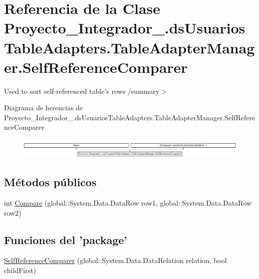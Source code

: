 \hypertarget{class_proyecto___integrador__3_1_1ds_usuarios_table_adapters_1_1_table_adapter_manager_1_1_self_reference_comparer}{\section{Referencia de la Clase Proyecto\-\_\-\-Integrador\-\_.\-ds\-Usuarios\-Table\-Adapters.\-Table\-Adapter\-Manager.\-Self\-Reference\-Comparer}
\label{class_proyecto___integrador__3_1_1ds_usuarios_table_adapters_1_1_table_adapter_manager_1_1_self_reference_comparer}
}


Used to sort self-\/referenced table's rows /summary$>$  


Diagrama de herencias de Proyecto\-\_\-\-Integrador\-\_.\-ds\-Usuarios\-Table\-Adapters.\-Table\-Adapter\-Manager.\-Self\-Reference\-Comparer\begin{figure}[H]
\begin{center}
\leavevmode
\includegraphics[height=0.982456cm]{class_proyecto___integrador__3_1_1ds_usuarios_table_adapters_1_1_table_adapter_manager_1_1_self_reference_comparer}
\end{center}
\end{figure}
\subsection*{Métodos públicos}
\begin{DoxyCompactItemize}
\item 
int \hyperlink{class_proyecto___integrador__3_1_1ds_usuarios_table_adapters_1_1_table_adapter_manager_1_1_self_reference_comparer_a78c217a295562cf7990f8af9d8dd393c}{Compare} (global\-::\-System.\-Data.\-Data\-Row row1, global\-::\-System.\-Data.\-Data\-Row row2)
\end{DoxyCompactItemize}
\subsection*{Funciones del 'package'}
\begin{DoxyCompactItemize}
\item 
\hyperlink{class_proyecto___integrador__3_1_1ds_usuarios_table_adapters_1_1_table_adapter_manager_1_1_self_reference_comparer_a48369f8c120506a95bdb9be253dddd7d}{Self\-Reference\-Comparer} (global\-::\-System.\-Data.\-Data\-Relation relation, bool child\-First)
\end{DoxyCompactItemize}
